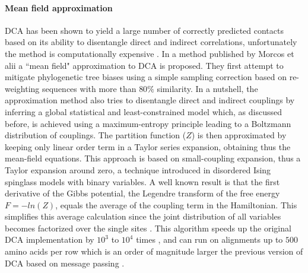\paragraph{Mean field approximation}
DCA has been shown to yield a large number of correctly predicted contacts based on its ability to disentangle direct and indirect correlations, unfortunately the method is computationally expensive \cite{weigt2009identification}.
In a method published by Morcos et alii \cite{morcos2011direct} a ``mean field" approximation to DCA is proposed.
They first attempt to mitigate phylogenetic tree biases using a simple sampling correction based on re-weighting  sequences with more than $80\%$ similarity.
In a nutshell, the approximation method also tries to disentangle direct and indirect couplings by inferring a global statistical and least-constrained model which, as discussed before, is achieved using a maximum-entropy principle leading to a Boltzmann distribution of couplings.
The partition function ($Z$) is then approximated by keeping only linear order term in a Taylor series expansion, obtaining thus the mean-field equations.
This approach is based on small-coupling expansion, thus a Taylor expansion around zero, a technique introduced in disordered Ising spinglass models with binary variables.
A well known result is that the first derivative of the Gibbs potential, the Legendre transform of the free energy $F = - ln(Z)$, equals the average of the coupling term in the Hamiltonian.
This simplifies this average calculation since the joint distribution of all variables becomes factorized over the single sites \cite{morcos2011direct}.
This algorithm speeds up the original DCA implementation by $10^3$ to $10^4$ times \cite{morcos2011direct}, and can run on alignments up to $500$ amino acids per row which is an order of magnitude larger the previous version of DCA based on message passing \cite{morcos2011direct, weigt2009identification}.

